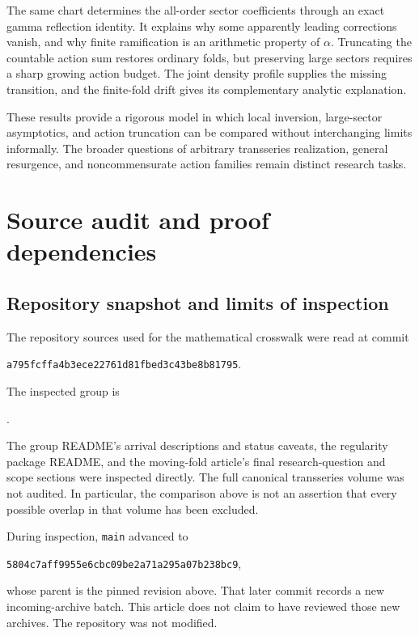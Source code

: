 \documentclass[11pt,a4paper]{article}
\numberwithin{equation}{section}
\theoremstyle{definition}
\theoremstyle{remark}
\begin{document}
The same chart determines the all-order sector coefficients through an
exact gamma reflection identity. It explains why some apparently leading
corrections vanish, and why finite ramification is an arithmetic property
of $\alpha$. Truncating the countable action sum restores ordinary folds,
but preserving large sectors requires a sharp growing action budget.
The joint density profile supplies the missing transition, and the
finite-fold drift gives its complementary analytic explanation.

These results provide a rigorous model in which local inversion,
large-sector asymptotics, and action truncation can be compared without
interchanging limits informally. The broader questions of arbitrary
transseries realization, general resurgence, and noncommensurate action
families remain distinct research tasks.

\appendix
\section{Source audit and proof dependencies}
\label{app:sources}

\subsection{Repository snapshot and limits of inspection}
The repository sources used for the mathematical crosswalk were read at
commit
\begin{center}
\small\texttt{a795fcffa4b3ece22761d81fbed3c43be8b81795}.
\end{center}
The inspected group is
\begin{center}
\small{}.
\end{center}
The group README's arrival descriptions and status caveats, the regularity
package README, and the moving-fold article's final research-question and
scope sections were inspected directly. The full canonical transseries
volume was not audited. In particular, the comparison above is not an
assertion that every possible overlap in that volume has been excluded.

During inspection, \texttt{main} advanced to
\begin{center}
\small\texttt{5804c7aff9955e6cbc09be2a71a295a07b238bc9},
\end{center}
whose parent is the pinned revision above. That later commit records a new incoming-archive
batch. This article does not claim to have reviewed those new archives.
The repository was not modified.
\end{document}
